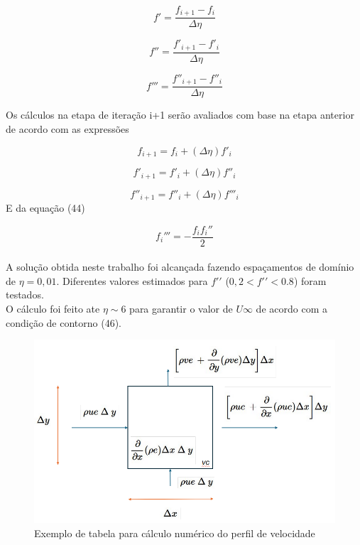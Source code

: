 \documentclass[12pt]{article}
\begin{document}
\begin{equation}
	f' = \frac{f_{i+1} - f_i}{\Delta \eta}
\end{equation}

\begin{equation}
	f'' = \frac{f'_{i+1} - f'_i}{\Delta \eta}
\end{equation}

\begin{equation}
	f''' = \frac{f''_{i+1} - f''_i}{\Delta \eta}
\end{equation}

Os cálculos na etapa de iteração i+1 serão avaliados com base na etapa anterior de acordo com as expressões

\begin{equation}
	f_{i+1} = f_i + (\Delta \eta) f'_i
\end{equation}

\begin{equation}
	f'_{i+1} = f'_i + (\Delta \eta) f''_i
\end{equation}

\begin{equation}
	f''_{i+1} = f''_i + (\Delta \eta) f'''_i
\end{equation}
E da equação (44)

\begin{equation}
	f_i''' = -\frac{f_i f_i''}{2}
\end{equation}
\\

A solução obtida neste trabalho foi alcançada fazendo espaçamentos de domínio de $\eta = 0,01$. Diferentes valores estimados para $f\prime\prime$ ($0,2 < f\prime\prime < 0.8$) foram testados. \\
 
 O cálculo foi feito ate $\eta \sim 6$ para garantir o valor de $U\infty$ de acordo com a condição de contorno (46).
 
 \begin{figure}[H]
 	\centering
 	\includegraphics[width=.65\textwidth]{Figures/1_4}
 	\caption{Exemplo de tabela para cálculo numérico do perfil de velocidade}
 \end{figure}
 
\end{document}

